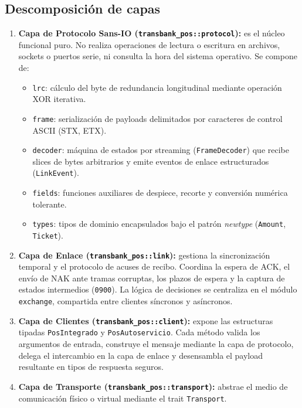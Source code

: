 \documentclass{../../plantilla/raysac-informe}
\begin{document}
\subsection{Descomposición de capas}
\begin{enumerate}
  \item \textbf{Capa de Protocolo Sans-IO (\texttt{transbank\_pos::protocol}):} es el núcleo funcional puro.
    No realiza operaciones de lectura o escritura en archivos, sockets o puertos serie, ni consulta la hora
    del sistema operativo. Se compone de:
    \begin{itemize}
      \item \texttt{lrc}: cálculo del byte de redundancia longitudinal mediante operación XOR iterativa.
      \item \texttt{frame}: serialización de payloads delimitados por caracteres de control ASCII (STX, ETX).
      \item \texttt{decoder}: máquina de estados por streaming (\texttt{FrameDecoder}) que recibe slices de bytes
        arbitrarios y emite eventos de enlace estructurados (\texttt{LinkEvent}).
      \item \texttt{fields}: funciones auxiliares de despiece, recorte y conversión numérica tolerante.
      \item \texttt{types}: tipos de dominio encapsulados bajo el patrón \emph{newtype} (\texttt{Amount}, \texttt{Ticket}).
    \end{itemize}
  \item \textbf{Capa de Enlace (\texttt{transbank\_pos::link}):} gestiona la sincronización temporal y el protocolo
    de acuses de recibo. Coordina la espera de ACK, el envío de NAK ante tramas corruptas, los plazos de espera
    y la captura de estados intermedios (\texttt{0900}). La lógica de decisiones se centraliza en el módulo
    \texttt{exchange}, compartida entre clientes síncronos y asíncronos.
  \item \textbf{Capa de Clientes (\texttt{transbank\_pos::client}):} expone las estructuras tipadas
    \texttt{PosIntegrado} y \texttt{PosAutoservicio}. Cada método valida los argumentos de entrada, construye
    el mensaje mediante la capa de protocolo, delega el intercambio en la capa de enlace y desensambla el
    payload resultante en tipos de respuesta seguros.
  \item \textbf{Capa de Transporte (\texttt{transbank\_pos::transport}):} abstrae el medio de comunicación físico
    o virtual mediante el trait \texttt{Transport}.
\end{enumerate}
\end{document}
